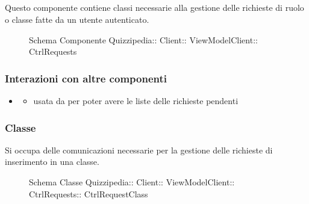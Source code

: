 \subsection{}
Questo componente contiene classi necessarie alla gestione delle richieste di ruolo o classe fatte da un utente autenticato.
\begin{figure}[H]
\centering
\noindent{}
\caption[Schema Componente CtrlRequests]{Schema Componente Quizzipedia:: Client:: ViewModelClient:: CtrlRequests}
\end{figure}
\subsubsection{Interazioni con altre componenti}
\begin{itemize}
\item {}
\begin{itemize}
\item usata da  per poter avere le liste delle richieste pendenti
\end{itemize}
\end{itemize}
\subsubsection{Classe }
Si occupa delle comunicazioni necessarie per la gestione delle richieste di inserimento in una classe.
\begin{figure}[H]
\centering
\noindent{}
\caption[Schema Classe CtrlRequestClass]{Schema Classe Quizzipedia:: Client:: ViewModelClient:: CtrlRequests:: CtrlRequestClass}
\end{figure}
